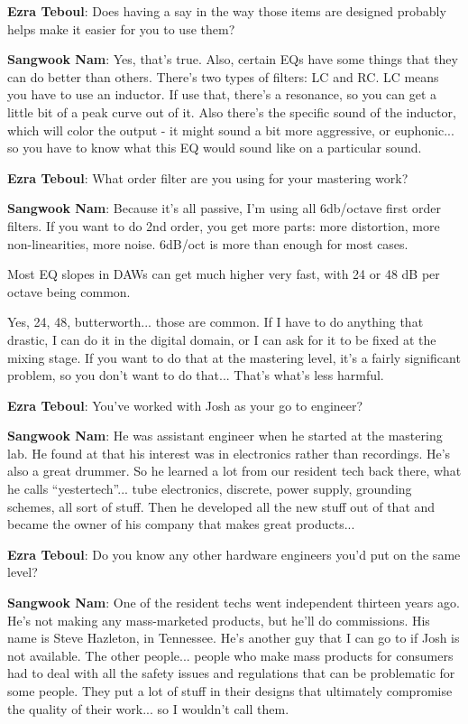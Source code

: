 \textbf{Ezra Teboul}: Does having a say in the way those items are designed probably helps make it easier for you to use them?

\textbf{Sangwook Nam}: Yes, that's true. Also, certain EQs have some things that they can do better than others. There's two types of filters: LC and RC. LC means you have to use an inductor. If use that, there's a resonance, so you can get a little bit of a peak curve out of it. Also there's the specific sound of the inductor, which will color the output - it might sound a bit more aggressive, or euphonic... so you have to know what this EQ would sound like on a particular sound.

\textbf{Ezra Teboul}: What order filter are you using for your mastering work?

\textbf{Sangwook Nam}: Because it's all passive, I'm using all 6db/octave first order filters. If you want to do 2nd order, you get more parts: more distortion, more non-linearities, more noise. 6dB/oct is more than enough for most cases.

Most EQ slopes in DAWs can get much higher very fast, with 24 or 48 dB per octave being common.

Yes, 24, 48, butterworth... those are common. If I have to do anything that drastic, I can do it in the digital domain, or I can ask for it to be fixed at the mixing stage. If you want to do that at the mastering level, it's a fairly significant problem, so you don't want to do that... That's what's less harmful.

\textbf{Ezra Teboul}: You've worked with Josh as your go to engineer?

\textbf{Sangwook Nam}: He was assistant engineer when he started at the mastering lab. He found at that his interest was in electronics rather than recordings. He's also a great drummer. So he learned a lot from our resident tech back there, what he calls ``yestertech''... tube electronics, discrete, power supply, grounding schemes, all sort of stuff. Then he developed all the new stuff out of that and became the owner of his company that makes great products...

\textbf{Ezra Teboul}: Do you know any other hardware engineers you'd put on the same level?

\textbf{Sangwook Nam}: One of the resident techs went independent thirteen years ago. He's not making any mass-marketed products, but he'll do commissions. His name is Steve Hazleton, in Tennessee. He's another guy that I can go to if Josh is not available. The other people... people who make mass products for consumers had to deal with all the safety issues and regulations that can be problematic for some people. They put a lot of stuff in their designs that ultimately compromise the quality of their work... so I wouldn't call them.

